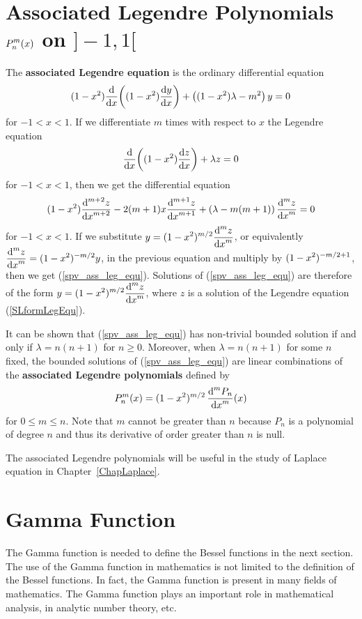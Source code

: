 \section{Associated Legendre Polynomials
$\DS P_n^m(x)$ on $]-1,1[$}

The {\bfseries associated Legendre equation} is the ordinary differential equation
\begin{equation} \label{spv_ass_leg_equ}
(1-x^2) \dfdx{ \left( (1-x^2) \dydx{y}{x} \right) }{x} +
\left( (1-x^2)\lambda - m^2 \right) y = 0
\end{equation}
for $-1 < x < 1$.  If we differentiate $m$ times with respect to $x$
the Legendre equation
\begin{equation} \label{SLformLegEqu}
\dfdx{ \left( (1-x^2) \dydx{z}{x}\right)}{x} + \lambda z = 0
\end{equation}
for $-1<x<1$, then we get the differential equation
\[
(1-x^2) \dydxn{z}{x}{m+2} - 2(m+1)x \dydxn{z}{x}{m+1} +
\left( \lambda - m(m+1)\right) \dydxn{z}{x}{m} = 0
\]
for $-1<x<1$.  If we substitute
$\DS y = (1-x^2)^{m/2}\dydxn{z}{x}{m}$,
or equivalently $\DS \dydxn{z}{x}{m} = (1-x^2)^{-m/2} y$,
in the previous equation and multiply by
$\DS (1-x^2)^{-m/2 +1}$, then we get
(\ref{spv_ass_leg_equ}).  Solutions of (\ref{spv_ass_leg_equ}) are
therefore of the form $\DS y = (1-x^2)^{m/2}\dydxn{z}{x}{m}$,
where $z$ is a solution of the Legendre equation (\ref{SLformLegEqu}).

It can be shown that (\ref{spv_ass_leg_equ}) has non-trivial bounded
solution if and only if $\lambda = n(n+1)$ for $n\geq 0$. 
Moreover, when $\lambda = n(n+1)$ for some $n$ fixed, the bounded solutions
of (\ref{spv_ass_leg_equ}) are linear combinations of the
{\bfseries associated Legendre polynomials} defined by 
\[
P_n^m(x) = (1-x^2)^{m/2}\, \dydxn{P_n}{x}{m}(x)
\]
for $0 \leq m \leq n$.  Note that $m$ cannot be greater than $n$
because $P_n$ is a polynomial of degree $n$ and thus its derivative of
order greater than $n$ is null.

The associated Legendre polynomials will be useful in the study of
Laplace equation in Chapter~\ref{ChapLaplace}.

\section{Gamma Function}

The Gamma function is needed to define the Bessel functions in the next
section.  The use of the Gamma function in mathematics is not
limited to the definition of the Bessel functions.  In fact, the Gamma
function is present in many fields of mathematics.  The Gamma function
plays an important role in mathematical analysis, in analytic number
theory, etc.

